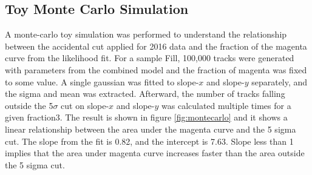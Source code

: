%
%
%
%
%


\subsection{Toy Monte Carlo Simulation}

A monte-carlo toy simulation was performed to understand the relationship between the accidental cut applied for 2016 data and the fraction of the magenta curve from the likelihood fit. For a sample Fill, 100,000 tracks were generated with parameters from the combined model and the fraction of magenta was fixed to some value. A single gaussian was fitted to slope-$x$ and slope-$y$ separately, and the sigma and mean was extracted. Afterward, the number of tracks falling outside the 5$\sigma$ cut on slope-$x$ and slope-$y$ was calculated multiple times for a given fraction3. The result is shown in figure \ref{fig:montecarlo} and it shows a linear relationship between the area under the magenta curve and the 5 sigma cut. The slope from the fit is 0.82, and the intercept is 7.63. Slope less than 1 implies that the area under magenta curve increases faster than the area outside the 5 sigma cut.


